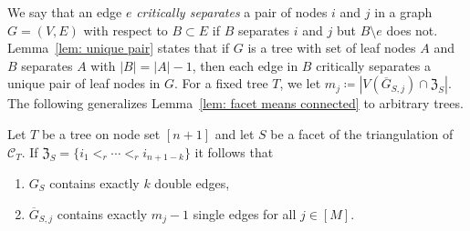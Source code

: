 We say that an edge $e$ \emph{critically separates} a pair of nodes $i$ and $j$ in a graph $G = (V,E)$ with respect to $B\subset E$  if $B$ separates $i$ and $j$ but $B\setminus e$ does not. 
Lemma~\ref{lem: unique pair} states that if $G$ is a tree with set of leaf nodes $A$ and $B$ separates $A$ with $|B| = |A| - 1$, then each edge in $B$ critically separates a unique pair of leaf nodes in $G$. 
For a fixed tree $T$, we let $m_j \coloneqq |V(\overline{G}_{S,j})\cap \mathfrak{Z}_S|$.  
The following generalizes Lemma~\ref{lem: facet means connected} to arbitrary trees.
\begin{lemm}
\label{lem: facets means connected for trees}
Let $T$ be a tree on node set $[n+1]$ and let $S$ be a facet of the triangulation of $\mathcal{C}_T$.   
If $\mathfrak{Z}_S = \{i_1 <_r \cdots <_r i_{n+1-k}\}$ %
it follows that
\begin{enumerate}
    \item $G_S$ contains exactly $k$ double edges,
	




    \item $\overline{G}_{S,j}$ contains exactly $m_j-1$ single edges for all $j\in[M]$. 
\end{enumerate}
\end{lemm}

